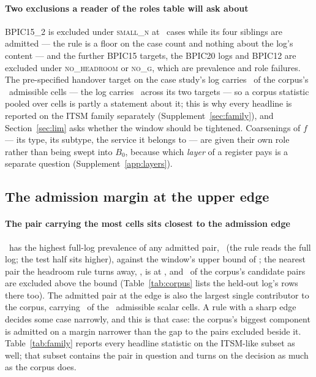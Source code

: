 \paragraph{Two exclusions a reader of the roles table will ask about}
BPIC15\_2 is excluded under \textsc{small\_n} at \nBpicFifteenTwoRows\ cases
while its four siblings are admitted --- the rule is a floor on the case count
and nothing about the log's content --- and the further BPIC15 targets, the
BPIC20 logs and BPIC12 are excluded under \textsc{no\_headroom} or
\textsc{no\_g}, which are prevalence and role failures. The pre-specified
handover target on the case study's log carries \nCellsBpicFourteenHandover\
of the corpus's \nDeclaredAdmissibleScalar\ admissible cells --- the log
carries \nCellsBpicFourteen\ across its two targets --- so a corpus statistic
pooled over cells is partly a statement about it; this is why every headline
is reported on the ITSM family separately (Supplement~\ref{sec:family}), and
Section~\ref{sec:lim} asks whether the window should be tightened.
Coarsenings of $f$ --- its type, its subtype, the service it belongs to ---
are given their own role rather than being swept into $B_0$, because which
\emph{layer} of a register pays is a separate question
(Supplement~\ref{app:layers}).

\subsection{The admission margin at the upper edge}
\label{app:margin}


\paragraph{The pair carrying the most cells sits closest to the admission
edge} \logAdmittedMaxPrev\ has the highest full-log prevalence of any
admitted pair, \prevAdmittedMax\ (the rule reads the full log; the test half
sits higher), against the window's upper bound of \prevHi; the nearest
pair the headroom rule turns away, \logExcludedAboveMin, is at
\prevExcludedAboveMin, and \nExcludedAbove\ of the corpus's candidate pairs
are excluded above the bound (Table~\ref{tab:corpus} lists the held-out log's
rows there too). The admitted pair at the edge is also the largest single
contributor to the corpus,
carrying \nCellsLargestPair\ of the \nComputationalCells\ admissible scalar
cells. A rule with a sharp edge decides some case narrowly, and this is that
case: the corpus's biggest component is admitted on a margin narrower than
the gap to the pairs excluded beside it. Table~\ref{tab:family} reports every
headline statistic on the ITSM-like subset as well; that subset contains the
pair in question and turns on the decision as much as the corpus does.


